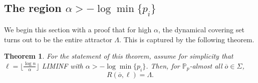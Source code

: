 \documentclass[12pt,]{article}
\newtheorem{theorem}{Theorem}[section]
\theoremstyle{definition}
\theoremstyle{remark}
\renewcommand{\Bbb}[1]{\mathbb{#1}}
\newcommand{\bbP}{{\Bbb P}}
\newcommand{\0}{\mathbf{0}}
\newcommand{\bo}{{\overline o}}
\begin{document}
\subsection{The region \texorpdfstring{$\alpha>-\log\min\{p_i\}$}{large a}}

We begin this section with a proof that for high $\alpha$, the dynamical covering set turns out to be the entire attractor $\Lambda$. This is captured by the
following theorem.
\begin{theorem}\label{thm:fullCover}
  For the statement of this theorem, assume for simplicity that $\ell=\lfloor \frac{\log n}{\alpha}\rfloor$ {\color{red} LIMINF} with
  $\alpha>-\log \min\{p_i\}$. Then, for
  $\bbP_p$-almost all $\bo\in\Sigma$,
  \[
    R(\bo, \ell) =  \Lambda.
  \]

\end{theorem}
\end{document}
